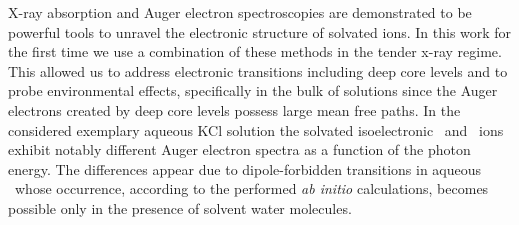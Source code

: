 X-ray absorption and Auger electron spectroscopies are demonstrated to be powerful tools to unravel the electronic structure of solvated ions. In this work for the first time we use a combination of these methods in the tender x-ray regime. %
This allowed us to address electronic transitions including deep core levels and to probe environmental effects, specifically in the bulk of solutions since the Auger electrons created by deep core levels possess large mean free paths. In the considered exemplary aqueous KCl solution the solvated isoelectronic \ki~and \cli~ions exhibit notably different Auger electron spectra as a function of the photon energy. The differences appear due to dipole-forbidden transitions in aqueous \ki~whose occurrence, according to the performed {\it ab initio} calculations, becomes possible only in the presence of solvent water molecules.